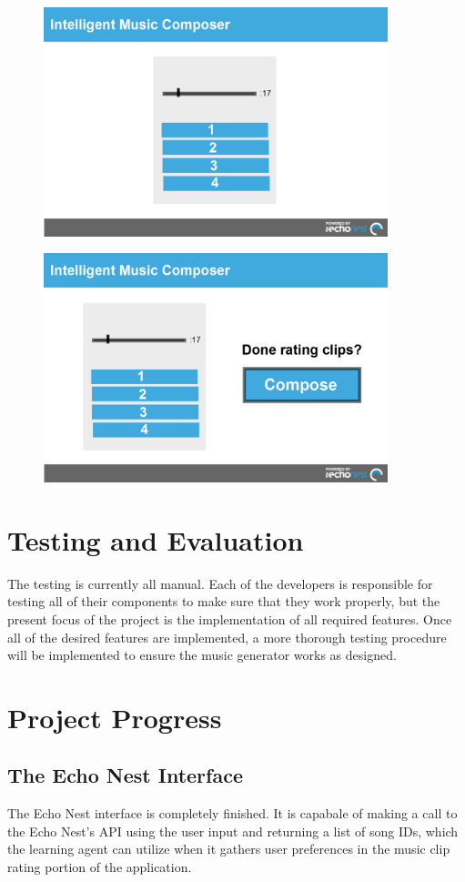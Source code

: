 \documentclass{article}
\begin{document}
\begin{figure}[H]
\centerline{\includegraphics[width=10cm]{pref.png}}
\end{figure}

\begin{figure}[H]
\centerline{\includegraphics[width=10cm]{compose.png}}
\end{figure}

\section{Testing and Evaluation}
The testing is currently all manual. Each of the developers is responsible for testing all of their
components to make sure that they work properly, but the present focus of the project is the 
implementation of all required features. Once all of the desired features are implemented, a
more thorough testing procedure will be implemented to ensure the music generator works as designed.

\section{Project Progress}
\subsection{The Echo Nest Interface}
The Echo Nest interface is completely finished.  It is capabale of making a call to the Echo Nest's API using the 
user input and returning a list of song IDs, which the learning agent can utilize when it gathers user preferences
in the music clip rating portion of the application.
\end{document}
